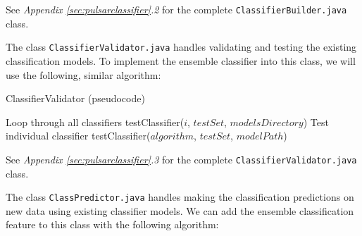 \documentclass{article}
\begin{document}
See \emph{Appendix \ref{sec:pulsarclassifier}.2} for the complete \verb|ClassifierBuilder.java| class. 

The class \verb|ClassifierValidator.java| handles validating and testing the existing classification models. To implement the ensemble classifier into this class, we will use the following, similar algorithm:

\begin{algorithm}[H]
    \caption{ClassifierValidator (pseudocode)}
    \begin{algorithmic}[1]
                \Comment Loop through all classifiers
                \State testClassifier($i$, $testSet$, $modelsDirectory$)
            \EndFor
        \Else 
            \Comment Test individual classifier
            \State testClassifier($algorithm$, $testSet$, $modelPath$)
        \EndIf
        
    \end{algorithmic}
\end{algorithm}

See \emph{Appendix \ref{sec:pulsarclassifier}.3} for the complete \verb|ClassifierValidator.java| class. 

The class \verb|ClassPredictor.java| handles making the classification predictions on new data using existing classifier models. We can add the ensemble classification feature to this class with the following algorithm:
\end{document}
